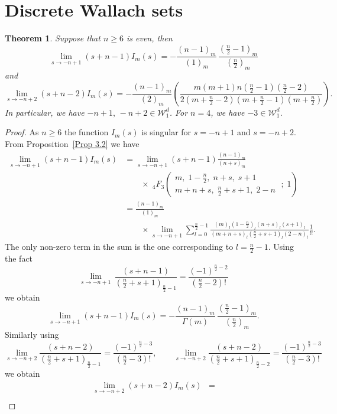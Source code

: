 \documentclass{article}
\theoremstyle{boldremark}
\newtheorem{theorem}{Theorem}[section]
\renewcommand\[{\begin{equation}}
\renewcommand\]{\end{equation}}
\theoremstyle{definition}
\numberwithin{equation}{section}
\begin{document}
\section{Discrete Wallach sets}
\begin{theorem}
 Suppose that $n \geq6$ is even, then 
 $$
  \lim_{s \to -n+1}(s +n-1)I_m(s)=-\frac{(n-1)_m}{(1)_m}\,\frac{\left(\frac{n}{2}-1\right)_m}{\left(\frac{n}{2}\right)_m}
 $$
 and
 $$
 \lim_{s \to -n+2}(s +n-2)I_m(s) = -\frac{(n-1)_m}{(2)_m}\left(\frac{m(m+1)n\left(\frac{n}{2}-1\right)\left(\frac{n}{2}-2\right)}{2\left(m+\frac{n}{2}-2\right)\left(m+\frac{n}{2}-1\right)\left(m+\frac{n}{2}\right)}\right).
 $$
 In particular, we have $-n+1, \, -n + 2 \in \mathcal{W}^d_1$. For $n=4$, we have $-3 \in \mathcal{W}^d_1.$
\end{theorem}
\begin{proof}
As $n \geq 6$ the function $I_m(s)$ is singular for $s = -n+1$ and $s = -n+2$. From Proposition~\ref{Prop 3.2} we have
\begin{align*}
    \lim_{s \to -n+1}(s +n-1)I_m(s) &=\lim_{s \to -n+1}(s+n-1) \frac{(n-1)_m}{(n+s)_m}\\
    & \qquad\times\;{}_4F_3 \left( \begin{matrix} m,\; 1 - \frac{n}{2},\; n+s,\; s+1 \\[4pt] m + n + s,\; \frac{n}{2} + s + 1,\; 2-n \end{matrix} \;;\; 1 \right)\\
    &= \frac{(n-1)_m}{(1)_m}\\
    & \qquad \times\lim_{s \to -n+1} \sum_{l=0}^{\frac{n}{2}-1} \frac{(m)_l \left(1 - \frac{n}{2}\right)_l (n+s)_l (s+1)_l}{(m + n + s)_l \left(\frac{n}{2} + s + 1\right)_l (2 - n)_l} \frac{1}{l!}.
\end{align*}
The only non-zero term in the sum is the one corresponding to \(l=\frac{n}{2}-1\). Using the fact $$
\lim_{s\to -n+1} \,\frac{(s+n-1)}{\left(\frac n2+s+1\right)_{\frac n2-1}}
=
\frac{(-1)^{\frac n2-2}}{\left(\frac n2-2\right)!}
$$
we obtain
$$
\lim_{s\to -n+1}(s+n-1)I_m(s)
=
-\frac{(n-1)_m}{\Gamma(m)}\,\frac{\left(\frac{n}{2}-1\right)_m}{\left(\frac{n}{2}\right)_m}.
$$
Similarly using 
\[
\lim_{s\to -n+2} \frac{(s+n-2)}{\left(\frac n2+s+1\right)_{\frac n2-1}}
=
\frac{(-1)^{\frac n2-3}}{\left(\frac n2-3\right)!}, \qquad \lim_{s\to -n+2} \frac{(s+n-2)}{\left(\frac n2+s+1\right)_{\frac n2-2}}
=
\frac{(-1)^{\frac n2-3}}{\left(\frac n2-3\right)!}
\]
we obtain 
\begin{align*}
     \lim_{s \to -n+2}(s +n-2)I_m(s) &=\\

\end{align*}
\end{proof}
\end{document}
